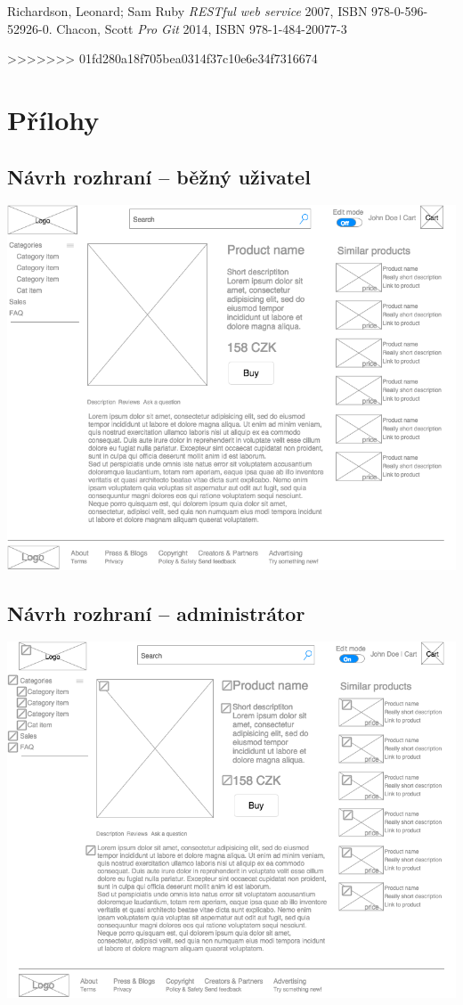 \documentclass[11pt,a4paper]{article}
\begin{document}
\begin{thebibliography}{1}

   Richardson, Leonard; Sam Ruby {\em  RESTful web service} 2007, ISBN 978-0-596-52926-0.
   Chacon, Scott {\em Pro Git} 2014, ISBN 978-1-484-20077-3

\end{thebibliography}
>>>>>>> 01fd280a18f705bea0314f37c10e6e34f7316674

\section*{Přílohy}

\subsection*{Návrh rozhraní -- běžný uživatel}
\includegraphics[scale=0.6]{pyngshop.png}
\subsection*{Návrh rozhraní -- administrátor}
\includegraphics[scale=0.6]{pyngshop_edit.png}
\newpage
\end{document}
